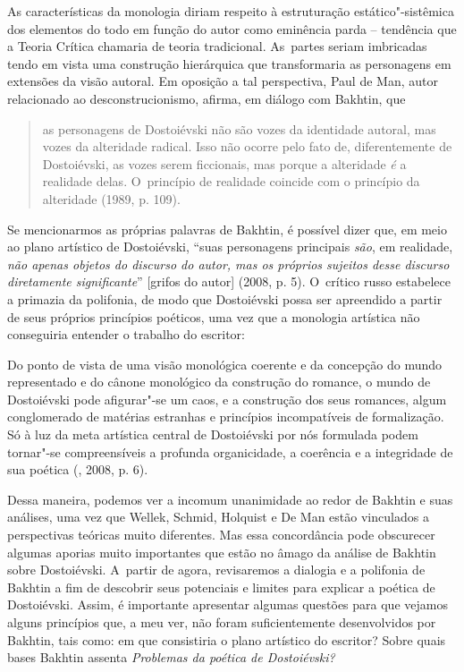 {As características da monologia diriam respeito à estruturação
estático"-sistêmica dos elementos do todo em função do autor como
eminência parda -- tendência que a Teoria Crítica chamaria de teoria
tradicional. As~partes seriam imbricadas tendo em vista uma construção
hierárquica que transformaria as personagens em extensões da visão
autoral. Em oposição a tal perspectiva, Paul de Man, autor relacionado
ao desconstrucionismo, afirma, em diálogo com Bakhtin, que

\begin{quote}
as personagens de Dostoiévski não são vozes da identidade autoral, mas
vozes da alteridade radical. Isso não ocorre pelo fato de,
diferentemente de Dostoiévski, as vozes serem ficcionais, mas porque a
alteridade \emph{é} a realidade delas. O~princípio de realidade coincide
com o princípio da alteridade (1989, p. 109).
\end{quote}

Se mencionarmos as próprias palavras de Bakhtin, é possível dizer que,
em meio ao plano artístico de Dostoiévski, ``suas personagens principais
\emph{são}, em realidade, \emph{não apenas objetos do discurso do autor,
mas os próprios sujeitos desse discurso diretamente significante}''
{[}grifos do autor{]} (2008, p. 5). O~crítico russo estabelece a
primazia da polifonia, de modo que Dostoiévski possa ser apreendido a
partir de seus próprios princípios poéticos, uma vez que a monologia
artística não conseguiria entender o trabalho do escritor:

Do ponto de vista de uma visão monológica coerente e da concepção do
mundo representado e do cânone monológico da construção do romance, o
mundo de Dostoiévski pode afigurar"-se um caos, e a construção dos seus
romances, algum conglomerado de matérias estranhas e princípios
incompatíveis de formalização. Só à luz da meta artística central de
Dostoiévski por nós formulada podem tornar"-se compreensíveis a profunda
organicidade, a coerência e a integridade de sua poética (, 2008,
p. 6).

Dessa maneira, podemos ver a incomum unanimidade ao redor de Bakhtin e
suas análises, uma vez que Wellek, Schmid, Holquist e De Man estão
vinculados a perspectivas teóricas muito diferentes. Mas essa
concordância pode obscurecer algumas aporias muito importantes que estão
no âmago da análise de Bakhtin sobre Dostoiévski. A~partir de agora,
revisaremos a dialogia e a polifonia de Bakhtin a fim de descobrir seus
potenciais e limites para explicar a poética de Dostoiévski. Assim, é
importante apresentar algumas questões para que vejamos alguns
princípios que, a meu ver, não foram suficientemente desenvolvidos por
Bakhtin, tais como: em que consistiria o plano artístico do escritor?
Sobre quais bases Bakhtin assenta \emph{Problemas da poética de
Dostoiévski? }

}

